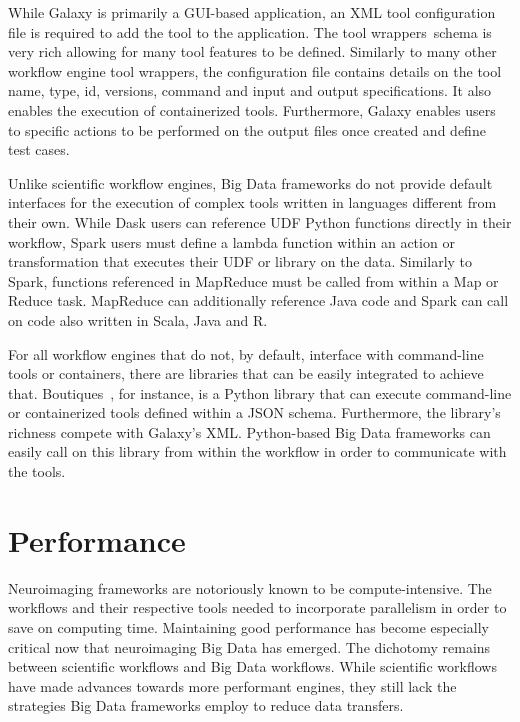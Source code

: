 \documentclass{report}
\begin{document}
            While Galaxy is primarily a GUI-based application, an XML tool
            configuration file is required to add the tool to the application.
            The tool wrappers\ schema is very rich allowing for many tool 
            features to be defined. Similarly to many other workflow engine tool
            wrappers, the configuration file contains details on the tool name, 
            type, id, versions, command and input and output specifications. It
            also enables the execution of containerized tools. Furthermore,
            Galaxy enables users to specific actions to be performed on the 
            output files once created and define test cases.

            Unlike scientific workflow engines, Big Data frameworks do not 
            provide default interfaces for the execution of complex tools 
            written in 
            languages different from their own. While Dask users can reference
            UDF Python functions directly in their workflow, Spark users
            must define a lambda function within an action or transformation 
            that executes their UDF or library on the data. Similarly to Spark,
            functions referenced in MapReduce must be called from within a Map
            or Reduce task. MapReduce can additionally reference Java 
            code and Spark can call on code also written in Scala, Java and R.

            For all workflow engines that do not, by default, interface with 
            command-line tools or containers, there are libraries that can be
            easily integrated to achieve that. 
            Boutiques~\cite{doi:10.1093/gigascience/giy016}, for instance, is a 
            Python library that can execute command-line or containerized tools
            defined within a JSON schema. Furthermore, the library's richness
            compete with Galaxy's XML. Python-based Big Data frameworks can 
            easily call on this library from within the workflow in order to
            communicate with the tools.

            
    \chapter{Performance}\label{performance}
        Neuroimaging frameworks are notoriously known to be compute-intensive.
        The workflows and their respective tools needed to incorporate 
        parallelism in order to save on computing time. Maintaining good 
        performance has become especially critical now that neuroimaging
        Big Data has emerged. The dichotomy remains between scientific 
        workflows and Big Data workflows. While scientific workflows have made
        advances towards more performant engines, they still lack the 
        strategies Big Data frameworks employ to reduce data transfers. 
        
\end{document}
